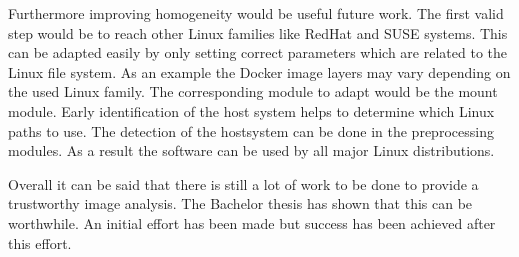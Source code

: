 Furthermore improving homogeneity would be useful future work.
The first valid step would be to reach other Linux families like RedHat and SUSE systems.
This can be adapted easily by only setting correct parameters which are related to the Linux file system.
As an example the Docker image layers may vary depending on the used Linux family.
The corresponding module to adapt would be the mount module.
Early identification of the host system helps to determine which Linux paths to use.
The detection of the hostsystem can be done in the preprocessing modules.
As a result the software can be used by all major Linux distributions.

Overall it can be said that there is still a lot of work to be done to provide a trustworthy image analysis.
The Bachelor thesis has shown that this can be worthwhile.
An initial effort has been made but success has been achieved after this effort.